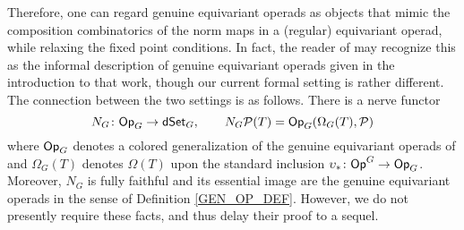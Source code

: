 \documentclass[a4paper,10pt
 ,draft
]{article}%
\begin{document}
\begin{remark}
Therefore, one can regard genuine equivariant operads as objects that mimic the composition combinatorics of the  norm maps in a (regular) equivariant operad, while relaxing the fixed point conditions.
In fact, the reader of \cite{BP17} may recognize this as the informal description of genuine equivariant operads given in the introduction to that work,
though our current formal setting is rather different.
The connection between the two settings is as follows.
There is a nerve functor
\begin{equation}\label{NG EQ}
N_G \colon \mathsf{Op}_G \to \mathsf{dSet}_G, \qquad N_G\mathcal{P}(T) = \mathsf{Op}_G(\Omega_G(T), \mathcal{P})
\end{equation}
where $\mathsf{Op}_G$ denotes a colored generalization of the genuine equivariant operads of \cite{BP17}
and $\Omega_G(T)$ denotes $\Omega(T)$ upon the standard inclusion
$\upsilon_{\**} \colon \Op^G \to \Op_G$.
Moreover, $N_G$ is fully faithful and its essential image are the genuine equivariant operads in the sense of Definition \ref{GEN_OP_DEF}.
However, we do not presently require these facts, and thus delay their proof to a sequel.
\end{remark}




\end{document}
